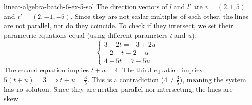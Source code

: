 \documentclass[preview]{standalone}
\begin{document}
\begin{snippetsolution}{linear-algebra-batch-6-ex-5-sol}{}
    The direction vectors of \(l\) and \(l'\) are \(v = (2, 1, 5)\) and \(v' = (2, -1, -5)\). Since they are not scalar multiples of each other, the lines are not parallel, nor do they coincide.
    To check if they intersect, we set their parametric equations equal (using different parameters \(t\) and \(u\)):
    \[
        \begin{cases}
            3 + 2t = -3 + 2u \\
            -2 + t = 2 - u \\
            4 + 5t = 7 - 5u
        \end{cases}
    \]
    The second equation implies \(t + u = 4\).
    The third equation implies \(5(t + u) = 3 \implies t + u = \frac{3}{5}\).
    This is a contradiction (\(4 \neq \frac{3}{5}\)), meaning the system has no solution. Since they are neither parallel nor intersecting, the lines are skew.
\end{snippetsolution}
\end{document}
